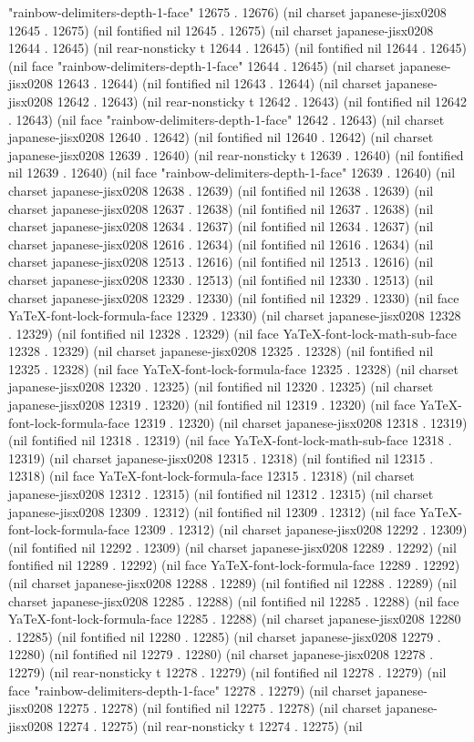"rainbow-delimiters-depth-1-face" 12675 . 12676) (nil charset japanese-jisx0208 12645 . 12675) (nil fontified nil 12645 . 12675) (nil charset japanese-jisx0208 12644 . 12645) (nil rear-nonsticky t 12644 . 12645) (nil fontified nil 12644 . 12645) (nil face "rainbow-delimiters-depth-1-face" 12644 . 12645) (nil charset japanese-jisx0208 12643 . 12644) (nil fontified nil 12643 . 12644) (nil charset japanese-jisx0208 12642 . 12643) (nil rear-nonsticky t 12642 . 12643) (nil fontified nil 12642 . 12643) (nil face "rainbow-delimiters-depth-1-face" 12642 . 12643) (nil charset japanese-jisx0208 12640 . 12642) (nil fontified nil 12640 . 12642) (nil charset japanese-jisx0208 12639 . 12640) (nil rear-nonsticky t 12639 . 12640) (nil fontified nil 12639 . 12640) (nil face "rainbow-delimiters-depth-1-face" 12639 . 12640) (nil charset japanese-jisx0208 12638 . 12639) (nil fontified nil 12638 . 12639) (nil charset japanese-jisx0208 12637 . 12638) (nil fontified nil 12637 . 12638) (nil charset japanese-jisx0208 12634 . 12637) (nil fontified nil 12634 . 12637) (nil charset japanese-jisx0208 12616 . 12634) (nil fontified nil 12616 . 12634) (nil charset japanese-jisx0208 12513 . 12616) (nil fontified nil 12513 . 12616) (nil charset japanese-jisx0208 12330 . 12513) (nil fontified nil 12330 . 12513) (nil charset japanese-jisx0208 12329 . 12330) (nil fontified nil 12329 . 12330) (nil face YaTeX-font-lock-formula-face 12329 . 12330) (nil charset japanese-jisx0208 12328 . 12329) (nil fontified nil 12328 . 12329) (nil face YaTeX-font-lock-math-sub-face 12328 . 12329) (nil charset japanese-jisx0208 12325 . 12328) (nil fontified nil 12325 . 12328) (nil face YaTeX-font-lock-formula-face 12325 . 12328) (nil charset japanese-jisx0208 12320 . 12325) (nil fontified nil 12320 . 12325) (nil charset japanese-jisx0208 12319 . 12320) (nil fontified nil 12319 . 12320) (nil face YaTeX-font-lock-formula-face 12319 . 12320) (nil charset japanese-jisx0208 12318 . 12319) (nil fontified nil 12318 . 12319) (nil face YaTeX-font-lock-math-sub-face 12318 . 12319) (nil charset japanese-jisx0208 12315 . 12318) (nil fontified nil 12315 . 12318) (nil face YaTeX-font-lock-formula-face 12315 . 12318) (nil charset japanese-jisx0208 12312 . 12315) (nil fontified nil 12312 . 12315) (nil charset japanese-jisx0208 12309 . 12312) (nil fontified nil 12309 . 12312) (nil face YaTeX-font-lock-formula-face 12309 . 12312) (nil charset japanese-jisx0208 12292 . 12309) (nil fontified nil 12292 . 12309) (nil charset japanese-jisx0208 12289 . 12292) (nil fontified nil 12289 . 12292) (nil face YaTeX-font-lock-formula-face 12289 . 12292) (nil charset japanese-jisx0208 12288 . 12289) (nil fontified nil 12288 . 12289) (nil charset japanese-jisx0208 12285 . 12288) (nil fontified nil 12285 . 12288) (nil face YaTeX-font-lock-formula-face 12285 . 12288) (nil charset japanese-jisx0208 12280 . 12285) (nil fontified nil 12280 . 12285) (nil charset japanese-jisx0208 12279 . 12280) (nil fontified nil 12279 . 12280) (nil charset japanese-jisx0208 12278 . 12279) (nil rear-nonsticky t 12278 . 12279) (nil fontified nil 12278 . 12279) (nil face "rainbow-delimiters-depth-1-face" 12278 . 12279) (nil charset japanese-jisx0208 12275 . 12278) (nil fontified nil 12275 . 12278) (nil charset japanese-jisx0208 12274 . 12275) (nil rear-nonsticky t 12274 . 12275) (nil 